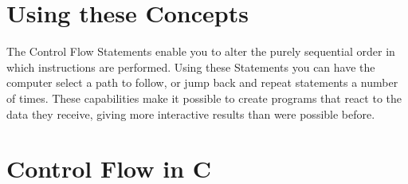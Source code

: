 

\clearpage
\section{Using these Concepts} %
\label{sec:control_flow_using_these_concepts}

The Control Flow Statements enable you to alter the purely sequential order in which instructions are performed. Using these Statements you can have the computer select a path to follow, or jump back and repeat statements a number of times. These capabilities make it possible to create programs that react to the data they receive, giving more interactive results than were possible before.




\clearpage
\def\pageLang{c}
\section{Control Flow in C} %
\label{sec:control_flow_in_c}










% 





